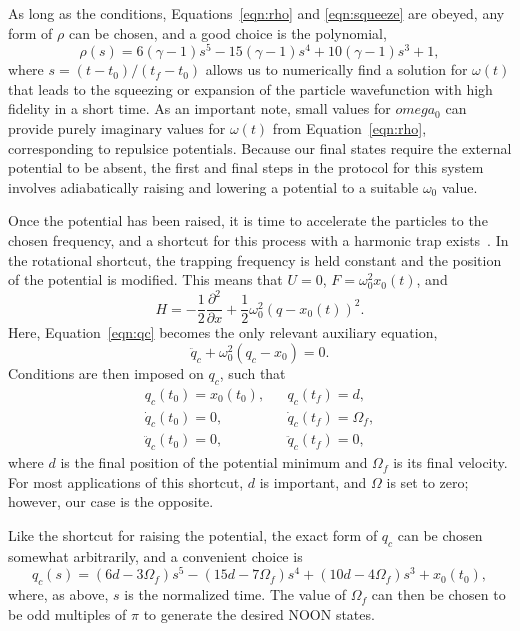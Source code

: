 As long as the conditions, Equations~\eqref{eqn:rho} and \eqref{eqn:squeeze} are obeyed, any form of $\rho$ can be chosen, and a good choice is the polynomial,
\begin{equation}
 \rho (s) = 6 \left(\gamma -1\right) s^5 -15 \left(\gamma-1\right) s^4 +10 \left(\gamma-1\right)s^3 + 1, \label{eq:rho_pol}
\end{equation}
\noindent where $s=(t-t_0)/(t_f-t_0)$ allows us to numerically find a solution for $\omega(t)$ that leads to the squeezing or expansion of the particle wavefunction with high fidelity in a short time.
As an important note, small values for $omega_0$ can provide purely imaginary values for $\omega(t)$ from Equation~\eqref{eqn:rho}, corresponding to repulsice potentials.
Because our final states require the external potential to be absent, the first and final steps in the protocol for this system involves adiabatically raising and lowering a potential to a suitable $\omega_0$ value. 

Once the potential has been raised, it is time to accelerate the particles to the chosen frequency, and a shortcut for this process with a harmonic trap exists~\cite{masuda2009,torrontegui2011,masuda2012}.
In the rotational shortcut, the trapping frequency is held constant and the position of the potential is modified.
This means that $U=0$, $F=\omega_0^2 x_0(t)$, and
\begin{equation}
 H= -\frac{1}{2} \frac{\partial^2}{\partial x}+ \frac 1 2 \omega^2_0 (q-x_0(t))^2.
\end{equation}
\noindent Here, Equation~\eqref{eqn:qc} becomes the only relevant auxiliary equation,
\begin{equation}
 \ddot{q}_c+\omega^2_0 (q_c-x_0)=0.
\end{equation}
Conditions are then imposed on $q_c$, such that
\begin{equation}
 \begin{array}{lcl}
q_c(t_0)=x_0(t_0), && q_c(t_f)=d,\\
\dot q_c(t_0)=0, && \dot q_c(t_f) =\Omega_f, \\
\ddot q_c(t_0)=0, && \ddot q_c(t_f)=0,
\end{array}
\end{equation}
\noindent where $d$ is the final position of the potential minimum and $\Omega_f$ is its final velocity. 
For most applications of this shortcut, $d$ is important, and $\Omega$ is set to zero; however, our case is the opposite.

Like the shortcut for raising the potential, the exact form of $q_c$ can be chosen somewhat arbitrarily, and a convenient choice is
\begin{equation}
 q_c(s)= (6 d -3 \Omega_f )s^5 - (15 d-7 \Omega_f )s^4+(10d-4 \Omega_f) s^3 + x_0(t_0),
\end{equation}
where, as above, $s$ is the normalized time.
The value of $\Omega_f$ can then be chosen to be odd multiples of $\pi$ to generate the desired NOON states.

